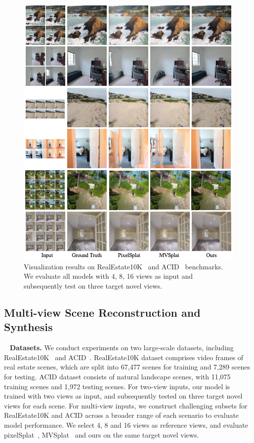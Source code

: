 \begin{figure}[t]
    \centering
    \includegraphics[width=\textwidth]{fig/main_result.png}
    \caption{Visualization results on RealEstate10K~\cite{RealEstate10K2018} and ACID~\cite{ACID2021ICCV} benchmarks. We evaluate all models with 4, 8, 16 views as input and subsequently test on three target novel views.}
    \label{fig: main result visual} 
    \vspace{-0.5cm}
\end{figure}

\subsection{Multi-view Scene Reconstruction and Synthesis}~\label{sec:main exp}
\textbf{Datasets.} We conduct experiments on two large-scale datasets, including RealEstate10K~\cite{RealEstate10K2018} and ACID~\cite{ACID2021ICCV}. RealEstate10K dataset comprises video frames of real estate scenes, which are split into 67,477 scenes for training and 7,289 scenes for testing.
ACID dataset consists of natural landscape scenes, with 11,075 training scenes and 1,972 testing scenes. 
For two-view inputs, our model is trained with two views as input, and subsequently tested on three target novel views for each scene. For multi-view inputs, we construct challenging subsets for RealEstate10K and ACID across a broader range of each scenario to evaluate model performance. We select 4, 8 and 16 views as reference views, and evaluate pixelSplat~\cite{pixelSplat2023arXiv}, MVSplat~\cite{MVSplat2024arXiv} and ours on the same target novel views.


